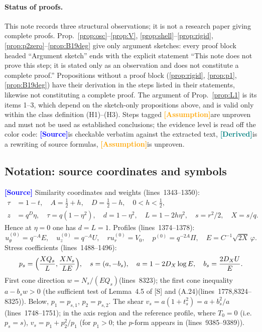 \documentclass[11pt,a4paper]{article}
\theoremstyle{definition}
\theoremstyle{remark}
\newcommand{\lnos}[1]{(lines~#1)}
\newcommand{\ORIG}{\textcolor{blue}{\textbf{[Source]}}}
\newcommand{\DER}{\textcolor{teal}{\textbf{[Derived]}}}
\newcommand{\HYP}{\textcolor{orange}{\textbf{[Assumption]}}}
\begin{document}
\paragraph{Status of proofs.}
This note records three structural observations; it is not a research paper giving complete proofs.
Prop.~\ref{prop:osc}--\ref{prop:V}, \ref{prop:shell}--\ref{prop:rigid},
\ref{prop:p2zero}--\ref{prop:B19deg} give only argument sketches: every proof block headed
``Argument sketch'' ends with the explicit statement ``This note does not prove this step; it is stated
only as an observation and does not constitute a complete proof.''
Propositions without a proof block (\ref{prop:rigid}, \ref{prop:p1}, \ref{prop:B19deg}) have their
derivation in the steps listed in their statements, likewise not constituting a complete proof.
The argument of Prop.~\ref{prop:L1} is its items 1--3, which depend on the sketch-only propositions
above, and is valid only within the class definition (H1)--(H3).
Steps tagged \HYP are unproven and must not be used as established conclusions;
the evidence level is read off the color code: \ORIG is checkable verbatim against the extracted text,
\DER is a rewriting of source formulas, \HYP is unproven.

\subsection*{Notation: source coordinates and symbols}
\label{sec:notation}

\ORIG
Similarity coordinates and weights \lnos{1343--1350}:
\begin{equation}
\label{eq:41}
\begin{aligned}
\tau&=1-t,\quad
A=\tfrac12+h,\quad
D=\tfrac12-h,\quad
0<h<\tfrac12,\\
z&=q^D\eta,\quad
\tau=q(1-\eta^2),\quad
d=1-\eta^2,\quad
L=1-2h\eta^2,\quad
s=r^2/2,\quad
X=s/q.
\end{aligned}
\end{equation}
Hence at $\eta=0$ one has $d=L=1$.
Profiles \lnos{1374--1378}:
\begin{equation}
\label{eq:43}
u^{(0)}_\theta=q^{-A}E,\quad
u^{(0)}_z=q^{-A}U,\quad
r u^{(0)}_r=V_0,\quad
p^{(0)}=q^{-2A}\Pi,\quad
E=C^{-1}\sqrt{2X}\,\varphi.
\end{equation}
Stress coefficients \lnos{1488--1496}:
\begin{equation}
\label{eq:411}
p_s=\Bigl(\frac{XQ_s}{L},\frac{XN_s}{LE}\Bigr),\quad
s=(a,-b_s),\quad
a=1-2D_X\log E,\quad
b_s=\frac{2D_X U}{E}.
\end{equation}
First cone direction $w=N_s/(EQ_s)$\lnos{8323}; the first cone inequality $a-b_s w>0$
(the sufficient test of Lemma~4.5 of [S] and (A.24)\lnos{1778,8324--8325}).
Below, $p_1=p_{s,1}$, $p_2=p_{s,2}$. The shear $v_s=a(1+t_s^2)=a+b_s^2/a$\lnos{1748--1751};
in the axis region and the reference profile, where $T_0=0$ (i.e.\ $p_s=s$),
$v_s=p_1+p_2^2/p_1$ (for $p_1>0$; the $p$-form appears in \lnos{9385--9389}).
\end{document}
